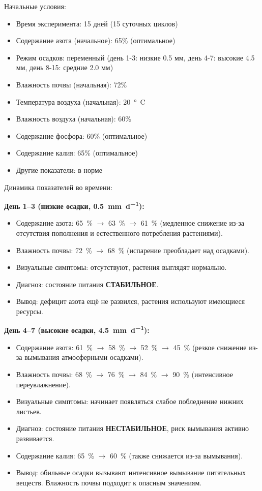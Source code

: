 Начальные условия:
\begin{itemize}
    \item Время эксперимента: 15 дней (15 суточных циклов)
    \item Содержание азота (начальное): 65\% (оптимальное)
    \item Режим осадков: переменный (день 1-3: низкие 0.5 мм, день 4-7: высокие 4.5 мм, день 8-15: средние 2.0 мм)
    \item Влажность почвы (начальная): 72\%
    \item Температура воздуха (начальная): \SI{20}{\degree C}
    \item Влажность воздуха (начальная): 60\%
    \item Содержание фосфора: 60\% (оптимальное)
    \item Содержание калия: 65\% (оптимальное)
    \item Другие показатели: в норме
\end{itemize}


Динамика показателей во времени:


\textbf{День 1--3 (низкие осадки, \SI{0.5}{\mm\per\day}):}
\begin{itemize}
    \item Содержание азота: \SI{65}{\percent} $\to$ \SI{63}{\percent} $\to$ \SI{61}{\percent} (медленное снижение из-за отсутствия пополнения и естественного потребления растениями).
    \item Влажность почвы: \SI{72}{\percent} $\to$ \SI{68}{\percent} (испарение преобладает над осадками).
    \item Визуальные симптомы: отсутствуют, растения выглядят нормально.
    \item Диагноз: состояние питания \textbf{СТАБИЛЬНОЕ}.
    \item Вывод: дефицит азота ещё не развился, растения используют имеющиеся ресурсы.
\end{itemize}

\textbf{День 4--7 (высокие осадки, \SI{4.5}{\mm\per\day}):}
\begin{itemize}
    \item Содержание азота: \SI{61}{\percent} $\to$ \SI{58}{\percent} $\to$ \SI{52}{\percent} $\to$ \SI{45}{\percent} (резкое снижение из-за вымывания атмосферными осадками).
    \item Влажность почвы: \SI{68}{\percent} $\to$ \SI{76}{\percent} $\to$ \SI{84}{\percent} $\to$ \SI{90}{\percent} (интенсивное переувлажнение).
    \item Визуальные симптомы: начинает появляться слабое побледнение нижних листьев.
    \item Диагноз: состояние питания \textbf{НЕСТАБИЛЬНОЕ}, риск вымывания активно развивается.
    \item Содержание калия: \SI{65}{\percent} $\to$ \SI{60}{\percent} (также снижается из-за вымывания).
    \item Вывод: обильные осадки вызывают интенсивное вымывание питательных веществ. Влажность почвы подходит к опасным значениям.
\end{itemize}

